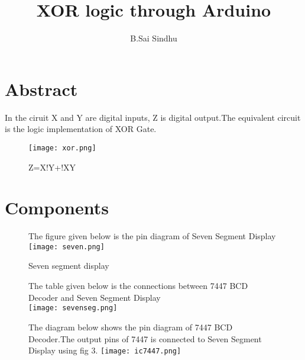 \documentclass[journal,12pt,twocolumn]{IEEEtran}
\begin{document}
%

\theoremstyle{definition}
\newtheorem{theorem}{Theorem}[section]
\newtheorem{problem}{Problem}
\newtheorem{proposition}{Proposition}[section]
\newtheorem{lemma}{Lemma}[section]
\newtheorem{corollary}[theorem]{Corollary}
\newtheorem{example}{Example}[section]
\newtheorem{definition}{Definition}[section]
\newcommand{\BEQA}{\begin{eqnarray}}
\newcommand{\EEQA}{\end{eqnarray}}
\newcommand{\define}{\stackrel{\triangle}{=}}
\vspace{2cm}
\title{ 
XOR logic through Arduino
}

\author{B.Sai Sindhu}


\maketitle
\tableofcontents
\bigskip
%
\section{Abstract}

In the ciruit X and Y are digital inputs, Z is digital output.The equivalent circuit is the logic implementation of XOR Gate.
\begin{figure}[h]
    \centering
    \texttt{[image: xor.png]}
    \caption{Z=X!Y+!XY}
    \label{fig:circuit}
\end{figure}
\section{\textbf{Components}}

\begin{table}[!h]
\centering
\caption{}
\label{table:7447_disp}
\end{table}
\begin{figure}
The figure given below is the pin diagram of Seven Segment Display\\
    \centering
    \texttt{[image: seven.png]}
    \caption{Seven segment display}
    \label{fig:my_label}
\end{figure}
\begin{figure}
The table given below is the connections between 7447 BCD Decoder and Seven Segment Display\\
    \centering
    \texttt{[image: sevenseg.png]}
    \caption{}
    \label{fig:my_label}
\end{figure}
\begin{figure}
The diagram below shows the pin diagram of 7447 BCD Decoder.The output pins of 7447 is connected to Seven Segment Display using fig 3.
    \centering
    \texttt{[image: ic7447.png]}
    \caption{}
    \label{fig:my_label}
\end{figure}
\end{document}
